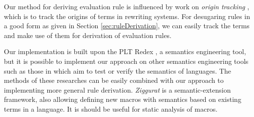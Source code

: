 Our method for deriving evaluation rule is influenced by work on \emph{origin tracking} \cite{origintracking}, which is to  track the origins of terms in rewriting systems.
For desugaring rules in a good form as given in Section \ref{sec:ruleDerivation}, we can easily track the terms and make use of them for derivation of evaluation rules.
%

Our implementation is built upon the PLT Redex \cite{SEwPR}, a semantics engineering tool, but it is possible to implement our approach on other semantics engineering tools such as those in \cite{dynsem,Ksemantic} which aim to test or verify the semantics of languages. The methods of these researches can be easily combined with our approach to implementing more general rule derivation. \emph{Ziggurat} \cite{Ziggurat} is a semantic-extension framework, also allowing defining new macros with semantics based on existing terms in a language. It is should be useful for static analysis of macros.

